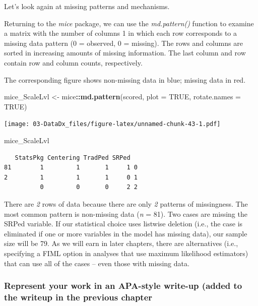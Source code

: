 \documentclass[
  11pt,
]{book}
\newenvironment{Shaded}{\begin{snugshade}}{\end{snugshade}}
\newcommand{\AttributeTok}[1]{\textcolor[rgb]{0.27,0.27,0.27}{#1}}
\newcommand{\ConstantTok}[1]{\textcolor[rgb]{0.37,0.37,0.37}{#1}}
\newcommand{\FunctionTok}[1]{\textcolor[rgb]{0.27,0.27,0.27}{\textbf{#1}}}
\newcommand{\NormalTok}[1]{#1}
\newcommand{\OtherTok}[1]{\textcolor[rgb]{0.37,0.37,0.37}{#1}}
\newcommand{\SpecialCharTok}[1]{\textcolor[rgb]{0.43,0.43,0.43}{\textbf{#1}}}
\begin{document}
Let's look again at missing patterns and mechanisms.

Returning to the \emph{mice} package, we can use the \emph{md.pattern()} function to examine a matrix with the number of columns 1 in which each row corresponds to a missing data pattern (0 = observed, 0 = missing). The rows and columns are sorted in increasing amounts of missing information. The last column and row contain row and column counts, respectively.

The corresponding figure shows non-missing data in blue; missing data in red.

\begin{Shaded}
\begin{Highlighting}[]
\NormalTok{mice\_ScaleLvl }\OtherTok{\textless{}{-}}\NormalTok{ mice}\SpecialCharTok{::}\FunctionTok{md.pattern}\NormalTok{(scored, }\AttributeTok{plot =} \ConstantTok{TRUE}\NormalTok{, }\AttributeTok{rotate.names =} \ConstantTok{TRUE}\NormalTok{)}
\end{Highlighting}
\end{Shaded}

\texttt{[image: 03-DataDx\_files/figure-latex/unnamed-chunk-43-1.pdf]}

\begin{Shaded}
\begin{Highlighting}[]
\NormalTok{mice\_ScaleLvl}
\end{Highlighting}
\end{Shaded}

\begin{verbatim}
   StatsPkg Centering TradPed SRPed  
81        1         1       1     1 0
2         1         1       1     0 1
          0         0       0     2 2
\end{verbatim}

There are \emph{2} rows of data because there are only \emph{2} patterns of missingness. The most common pattern is non-missing data (\emph{n} = 81). Two cases are missing the SRPed variable. If our statistical choice uses listwise deletion (i.e., the case is eliminated if one or more variables in the model has missing data), our sample size will be 79. As we will earn in later chapters, there are alternatives (i.e., specifying a FIML option in analyses that use maximum likelihood estimators) that can use all of the cases -- even those with missing data.

\hypertarget{represent-your-work-in-an-apa-style-write-up-added-to-the-writeup-in-the-previous-chapter}{%
\subsubsection*{Represent your work in an APA-style write-up (added to the writeup in the previous chapter}\label{represent-your-work-in-an-apa-style-write-up-added-to-the-writeup-in-the-previous-chapter}}
\end{document}
